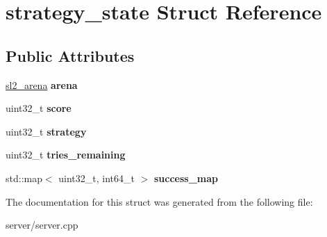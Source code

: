 \hypertarget{structstrategy__state}{}\section{strategy\+\_\+state Struct Reference}
\label{structstrategy__state}
\subsection*{Public Attributes}
\begin{DoxyCompactItemize}
\item 
\mbox{\label{structstrategy__state_a5262be2d8b4f19b7a57efe2a6369bf2f}} 
\mbox{\hyperlink{structsl2__arena}{sl2\+\_\+arena}} {\bfseries arena}
\item 
\mbox{\label{structstrategy__state_a883a9eef8aca92431d4795bde8220f81}} 
uint32\+\_\+t {\bfseries score}
\item 
\mbox{\label{structstrategy__state_a8e806e1ee70348465af9432ea3478ad0}} 
uint32\+\_\+t {\bfseries strategy}
\item 
\mbox{\label{structstrategy__state_a5c80296f6c8fe54bde23aec4c3b4b228}} 
uint32\+\_\+t {\bfseries tries\+\_\+remaining}
\item 
\mbox{\label{structstrategy__state_a8ce05d4d69af25143366081d042f53f5}} 
std\+::map$<$ uint32\+\_\+t, int64\+\_\+t $>$ {\bfseries success\+\_\+map}
\end{DoxyCompactItemize}


The documentation for this struct was generated from the following file\+:\begin{DoxyCompactItemize}
\item 
server/server.\+cpp\end{DoxyCompactItemize}

